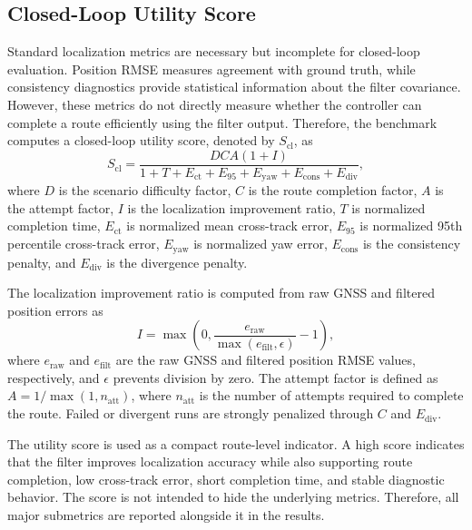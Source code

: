 \documentclass[conference]{IEEEtran}
\begin{document}
\subsection{Closed-Loop Utility Score}

Standard localization metrics are necessary but incomplete for closed-loop evaluation. Position RMSE measures agreement with ground truth, while consistency diagnostics provide statistical information about the filter covariance. However, these metrics do not directly measure whether the controller can complete a route efficiently using the filter output. Therefore, the benchmark computes a closed-loop utility score, denoted by $S_{\mathrm{cl}}$, as
\begin{equation}
S_{\mathrm{cl}} =
\frac{D C A (1 + I)}
{1 + T + E_{\mathrm{ct}} + E_{95} + E_{\mathrm{yaw}} + E_{\mathrm{cons}} + E_{\mathrm{div}}},
\label{eq:utility}
\end{equation}
where $D$ is the scenario difficulty factor, $C$ is the route completion factor, $A$ is the attempt factor, $I$ is the localization improvement ratio, $T$ is normalized completion time, $E_{\mathrm{ct}}$ is normalized mean cross-track error, $E_{95}$ is normalized 95th percentile cross-track error, $E_{\mathrm{yaw}}$ is normalized yaw error, $E_{\mathrm{cons}}$ is the consistency penalty, and $E_{\mathrm{div}}$ is the divergence penalty.

The localization improvement ratio is computed from raw GNSS and filtered position errors as
\begin{equation}
I = \max\left(0,\frac{e_{\mathrm{raw}}}{\max(e_{\mathrm{filt}},\epsilon)} - 1\right),
\label{eq:improvement}
\end{equation}
where $e_{\mathrm{raw}}$ and $e_{\mathrm{filt}}$ are the raw GNSS and filtered position RMSE values, respectively, and $\epsilon$ prevents division by zero. The attempt factor is defined as $A=1/\max(1,n_{\mathrm{att}})$, where $n_{\mathrm{att}}$ is the number of attempts required to complete the route. Failed or divergent runs are strongly penalized through $C$ and $E_{\mathrm{div}}$.

The utility score is used as a compact route-level indicator. A high score indicates that the filter improves localization accuracy while also supporting route completion, low cross-track error, short completion time, and stable diagnostic behavior. The score is not intended to hide the underlying metrics. Therefore, all major submetrics are reported alongside it in the results.
\end{document}
